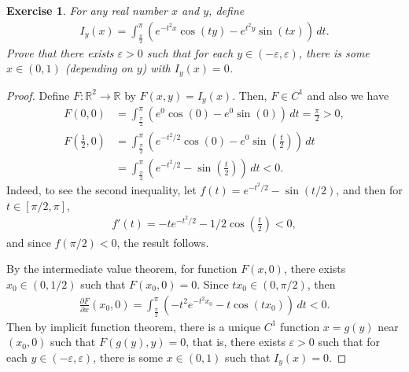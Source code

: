 \documentclass[11pt]{article}
\newtheorem{exercise}{Exercise}[section]
\theoremstyle{definition}
\numberwithin{equation}{subsection}
\begin{document}
\begin{exercise}{\rm *}\label{Aug_2017_1}
For any real number $x$ and $y$, define
\begin{align*}
    I_y(x) = \int^{\pi}_{\frac{\pi}{2}} \left(e^{-t^2 x} \cos (ty) - e^{t^2 y} \sin (tx) \right)\, dt.
\end{align*}
Prove that there exists $\varepsilon > 0$ such that for each $y \in (-\varepsilon, \varepsilon)$, there is some $x \in (0, 1)$ (depending on $y$) with $I_y(x) = 0$.
\end{exercise}
\begin{proof}
Define $F: \mathbb{R}^2 \to \mathbb{R}$ by $F(x,y) = I_y(x)$. Then, $F \in C^1$ and also we have
\begin{align*}
    F(0,0) & = \int^{\pi}_{\frac{\pi}{2}} \left(e^{0} \cos (0) - e^{0} \sin (0) \right)\, dt = \frac{\pi}{2} > 0, \\
    F\left(\frac{1}{2}, 0\right) & = \int^{\pi}_{\frac{\pi}{2}} \left(e^{-t^2/2} \cos (0) - e^{0} \sin \left(\frac{t}{2}\right) \right)\, dt \\
    & = \int^{\pi}_{\frac{\pi}{2}} \left(e^{-t^2/2} - \sin \left(\frac{t}{2}\right) \right)\, dt < 0.
\end{align*}
Indeed, to see the second inequality, let $f(t) = e^{-t^2/2} - \sin (t/2)$, and then for $t \in [\pi/2, \pi]$,
\begin{align*}
    f'(t) = - te^{-t^2/2} - 1/2 \cos \left(\frac{t}{2}\right) < 0,
\end{align*}
and since $f(\pi/2) < 0$, the result follows. 

By the intermediate value theorem, for function $F(x, 0)$, there exists $x_0 \in \left(0, 1/2\right)$ such that $F(x_0, 0) = 0$. Since $tx_0 \in (0, \pi/2)$, then
\begin{align*}
    \frac{\partial F}{\partial x}(x_0, 0) = \int^{\pi}_{\frac{\pi}{2}} \left(- t^2 e^{-t^2 x_0} - t \cos (tx_0) \right)\, dt < 0.
\end{align*}
Then by implicit function theorem, there is a unique $C^1$ function $x = g(y)$ near $(x_0, 0)$ such that $F(g(y), y) = 0$, that is, there exists $\varepsilon > 0$ such that for each $y \in (-\varepsilon, \varepsilon)$, there is some $x \in (0,1)$ such that $I_y(x) = 0$.
\end{proof}
\end{document}
